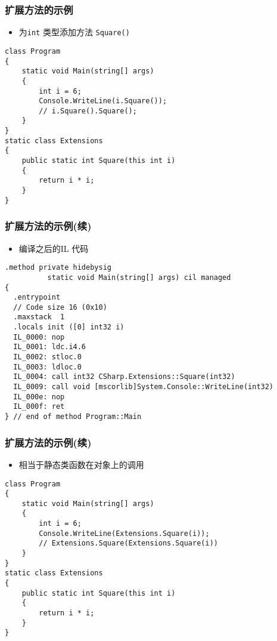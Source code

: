 \begin{frame}[fragile]
\frametitle{扩展方法的示例}
\begin{itemize}
\item 为\texttt{int} 类型添加方法 \texttt{Square()}
\end{itemize}
\begin{lstlisting}
class Program
{
    static void Main(string[] args)
    {
        int i = 6;
        Console.WriteLine(i.Square());
        // i.Square().Square();
    }
}
static class Extensions
{
    public static int Square(this int i)
    {
        return i * i;
    }
}

\end{lstlisting}
\end{frame}

\begin{frame}[fragile]
\frametitle{扩展方法的示例(续)}

\begin{itemize}
\item 编译之后的IL 代码
\end{itemize}
\begin{lstlisting}
.method private hidebysig
          static void Main(string[] args) cil managed
{
  .entrypoint
  // Code size 16 (0x10)
  .maxstack  1
  .locals init ([0] int32 i)
  IL_0000: nop
  IL_0001: ldc.i4.6
  IL_0002: stloc.0
  IL_0003: ldloc.0
  IL_0004: call int32 CSharp.Extensions::Square(int32)
  IL_0009: call void [mscorlib]System.Console::WriteLine(int32)
  IL_000e: nop
  IL_000f: ret
} // end of method Program::Main
\end{lstlisting}
\end{frame}


\begin{frame}[fragile]
\frametitle{扩展方法的示例(续)}
\begin{itemize}
\item 相当于静态类函数在对象上的调用
\end{itemize}
\begin{lstlisting}
class Program
{
    static void Main(string[] args)
    {
        int i = 6;
        Console.WriteLine(Extensions.Square(i));
        // Extensions.Square(Extensions.Square(i))
    }
}
static class Extensions
{
    public static int Square(this int i)
    {
        return i * i;
    }
}

\end{lstlisting}
\end{frame}


